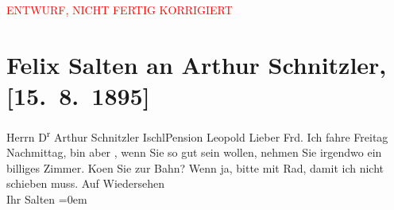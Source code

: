 
\begin{center}
            \textcolor{red}{ENTWURF, NICHT FERTIG KORRIGIERT}
                      \end{center}
            
         \renewcommand{\erwaehnteOrte}{Orte: Bad Ischl, Hotel und Pension Rudolfshöhe (Leopold Petter), I., Innere Stadt, Wien}
         \renewcommand{\erwaehnteWerke}{}
               \section[Felix Salten an Arthur Schnitzler, {[}15. 8. 1895{]}]{ Felix Salten an Arthur Schnitzler, {[}15. 8. 1895{]}}\nopagebreak{}\rehead{ }\begin{ledgroupsized}[t]{13cm}\normalsize\beginnumbering \toendnotes[C]{\smallbreak\pagebreak[2]} 
\toendnotes[C]{\smallbreak}\pstart{}{\pb}Herrn D\textsuperscript{r} Arthur Schnitzler \pend{}\pstart{}Ischl\pend{}\pstart{}Pension Leopold\pend{}{\bigskip}\pstart
           \noindent{}{\pb}Lieber Frd. Ich fahre Freitag{ }Nachmittag, bin aber
               \label{K_L03163-1v}\label{K_L03163-1h}, wenn Sie so gut sein wollen,
               nehmen Sie irgendwo ein billiges Zimmer. Ko{\geminationm}en Sie zur
               Bahn? Wenn ja, bitte mit Rad, damit ich nicht schieben muss. \pend
           \pstart
           Auf Wiedersehen {\\[\baselineskip]}Ihr \spacefill\mbox{Salten}\pend
           \leftskip=0em{}
         
         \endnumbering{}\end{ledgroupsized}\begin{anhang}\end{anhang}\newcommand{\dateiname}{L03163}\newcommand{\titel}{Felix Salten an Arthur Schnitzler, [15. 8. 1895]}\newcommand{\editorInnen}{Martin Anton Müller und Laura Untner}
      